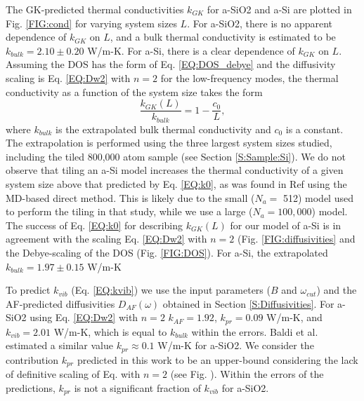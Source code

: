 \documentclass[aps,prb,twocolumn,superscriptaddress,footinbib,amsmath,amssymb,floatfix]{revtex4}
\begin{document}
The GK-predicted thermal conductivities $k_{GK}$ for a-SiO2 and a-Si 
are plotted in Fig. \ref{FIG:cond} for 
varying system sizes $L$. For a-SiO2, there is no apparent dependence 
of $k_{GK}$ on $L$, and a bulk thermal conductivity is estimated 
to be $k_{bulk}=2.10 \pm 0.20$ W/m-K. 
For a-Si, there is a clear dependence of $k_{GK}$ on 
$L$. Assuming the DOS has the form of Eq. \eqref{EQ:DOS_debye} 
and the diffusivity scaling 
is Eq. \eqref{EQ:Dw2} with $n=2$ 
for the low-frequency modes, 
the thermal conductivity as a function of the system size 
takes the form
\begin{equation}\label{EQ:k0}
\frac{k_{GK}(L)}{k_{bulk}} = 1 - \frac{c_0}{L},
\end{equation}
where $k_{bulk}$ is the extrapolated bulk thermal conductivity and $c_0$ 
is a constant.\cite{shiomi_thermal_2011,esfarjani_heat_2011,
larkin_comparison_2012} 
The extrapolation is performed using the three largest 
system sizes studied, including the tiled 800,000 atom sample (see 
Section \ref{S:Sample:Si}). 
We do not observe that tiling an a-Si model increases 
the thermal 
conductivity of a given system size above that predicted by 
Eq. \eqref{EQ:k0}, as 
was found in Ref  using the MD-based 
direct method. This is likely due to the 
small ($N_a = $ 512) model used to perform the tiling in that study, 
while we use a large ($N_a = 100,000$) model. 
The success of 
Eq. \eqref{EQ:k0} for describing $k_{GK}(L)$ for our model of a-Si 
is in agreement with the scaling Eq. \eqref{EQ:Dw2} with $n=2$ 
(Fig. \ref{FIG:diffusivities} 
and the Debye-scaling of the DOS (Fig. \ref{FIG:DOS}). 
For a-Si, the extrapolated $k_{bulk} = 1.97 \pm 0.15$ W/m-K

To predict $k_{vib}$ (Eq. \eqref{EQ:kvib}) we use the input parameters 
($B$ and $\omega_{cut}$) and the AF-predicted diffusivities 
$D_{AF}(\omega)$ obtained in Section \ref{S:Diffusivities}. 
For a-SiO2 using Eq. \eqref{EQ:Dw2} with $n=2$ $k_{AF} = 1.92$, 
$k_{pr} = 0.09$ W/m-K, and 
$k_{vib} = 2.01$ W/m-K, which is equal to $k_{bulk}$ within 
the errors.  
Baldi et al. estimated a similar value $k_{pr}\approx0.1$ W/m-K 
for a-SiO2.\cite{baldi_thermal_2008} 
We consider the contribution 
$k_{pr}$ predicted in this work to be an upper-bound considering 
the lack of definitive scaling of Eq. with $n=2$ (see Fig. ). 
Within the errors of the predictions, $k_{pr}$ is not a significant 
fraction of $k_{vib}$ for a-SiO2. 
\end{document}
